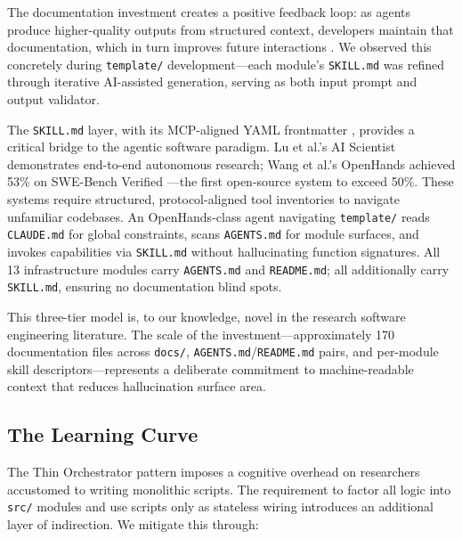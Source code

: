 \documentclass[
]{article}
\begin{document}
The documentation investment creates a positive feedback loop: as agents
produce higher-quality outputs from structured context, developers
maintain that documentation, which in turn improves future interactions
\citep{lau2025aicoding}. We observed this concretely during
\texttt{template/} development---each module's \texttt{SKILL.md} was
refined through iterative AI-assisted generation, serving as both input
prompt and output validator.

The \texttt{SKILL.md} layer, with its MCP-aligned YAML frontmatter
\citep{anthropic2024mcp}, provides a critical bridge to the agentic
software paradigm. Lu et al.'s AI Scientist \citep{lu2024aiscientist}
demonstrates end-to-end autonomous research; Wang et al.'s OpenHands
\citep{wang2024opendevin} achieved 53\% on SWE-Bench Verified
\citep{jimenez2024swebench}---the first open-source system to exceed
50\%. These systems require structured, protocol-aligned tool
inventories to navigate unfamiliar codebases. An OpenHands-class agent
navigating \texttt{template/} reads \texttt{CLAUDE.md} for global
constraints, scans \texttt{AGENTS.md} for module surfaces, and invokes
capabilities via \texttt{SKILL.md} without hallucinating function
signatures. All 13 infrastructure modules carry \texttt{AGENTS.md} and
\texttt{README.md}; all additionally carry \texttt{SKILL.md}, ensuring
no documentation blind spots.

This three-tier model is, to our knowledge, novel in the research
software engineering literature. The scale of the
investment---approximately 170 documentation files across
\texttt{docs/}, \texttt{AGENTS.md}/\texttt{README.md} pairs, and
per-module skill descriptors---represents a deliberate commitment to
machine-readable context that reduces hallucination surface area.

\subsection{The Learning Curve}\label{the-learning-curve}

The Thin Orchestrator pattern imposes a cognitive overhead on
researchers accustomed to writing monolithic scripts. The requirement to
factor all logic into \texttt{src/} modules and use scripts only as
stateless wiring introduces an additional layer of indirection. We
mitigate this through:
\end{document}
